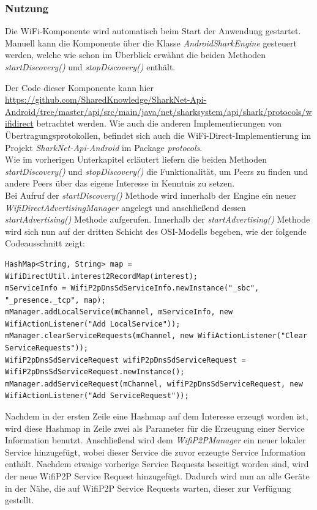 \subsubsection{Nutzung}
Die WiFi-Komponente wird automatisch beim Start der Anwendung gestartet. Manuell kann die Komponente über die Klasse \textit{AndroidSharkEngine} gesteuert werden, welche wie schon im Überblick erwähnt die beiden Methoden \textit{startDiscovery()} und \textit{stopDiscovery()} enthält.


Der Code dieser Komponente kann hier \url{https://github.com/SharedKnowledge/SharkNet-Api-Android/tree/master/api/src/main/java/net/sharksystem/api/shark/protocols/wifidirect} betrachtet werden. Wie auch die anderen Implementierungen von Über\-tra\-gungs\-pro\-to\-kol\-len, befindet sich auch die WiFi-Direct-Implementierung im Projekt \textit{SharkNet-Api-Android} im Package \textit{protocols}.
\\Wie im vorherigen Unterkapitel erläutert liefern die beiden Methoden \textit{startDiscovery()} und \textit{stopDiscovery()} die Funktionalität, um Peers zu finden und andere Peers über das eigene Interesse in Kenntnis zu setzen. 
\\Bei Aufruf der \textit{startDiscovery()} Methode wird innerhalb der Engine ein neuer \textit{WifiDirectAdvertisingManager} angelegt und anschließend dessen \textit{startAdvertising()} Methode aufgerufen. Innerhalb der \textit{startAdvertising()} Methode wird sich nun auf der dritten Schicht des OSI-Modells begeben, wie der folgende Codeausschnitt zeigt:
\lstset{language=Java, caption=Hinzufügung des Services, label=DescriptiveLabel, numbers=left, numbersep=1em, breaklines=true, basicstyle=\small}
\begin{lstlisting}
HashMap<String, String> map = WifiDirectUtil.interest2RecordMap(interest);
mServiceInfo = WifiP2pDnsSdServiceInfo.newInstance("_sbc", "_presence._tcp", map);
mManager.addLocalService(mChannel, mServiceInfo, new WifiActionListener("Add LocalService"));
mManager.clearServiceRequests(mChannel, new WifiActionListener("Clear ServiceRequests"));
WifiP2pDnsSdServiceRequest wifiP2pDnsSdServiceRequest = WifiP2pDnsSdServiceRequest.newInstance();
mManager.addServiceRequest(mChannel, wifiP2pDnsSdServiceRequest, new WifiActionListener("Add ServiceRequest"));
\end{lstlisting}
Nachdem in der ersten Zeile eine Hashmap auf dem Interesse erzeugt worden ist, wird diese Hashmap in Zeile zwei als Parameter für die Erzeugung einer Service Information benutzt. Anschließend wird dem \textit{WifiP2PManager} ein neuer lokaler Service hinzugefügt, wobei dieser Service die zuvor erzeugte Service Information enthält. Nachdem etwaige vorherige Service Requests beseitigt worden sind, wird der neue WifiP2P Service Request hinzugefügt. Dadurch wird nun an alle Geräte in der Nähe, die auf WifiP2P Service Requests warten, dieser zur Verfügung gestellt.
